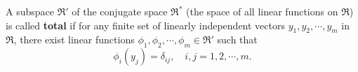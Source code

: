 A subspace $\mathfrak{R}'$ of the conjugate space $\mathfrak{R}^*$ (the space of all linear functions on $\mathfrak{R}$) is called \textbf{total} if for any finite set of linearly independent vectors $y_1, y_2, \cdots, y_m$ in $\mathfrak{R}$, there exist linear functions $\phi_1, \phi_2, \cdots, \phi_m \in \mathfrak{R}'$ such that
$$\phi_i(y_j) = \delta_{ij}, \quad i, j = 1, 2, \cdots, m.$$
